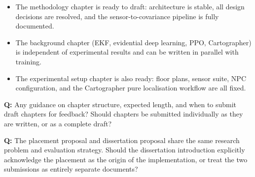 \documentclass[11pt,a4paper]{article}
\newcommand{\question}[1]{\textcolor{question}{\textbf{Q:}} #1}
\begin{document}
\begin{itemize}[leftmargin=*]
  \item The methodology chapter is ready to draft: architecture is stable,
    all design decisions are resolved, and the sensor-to-covariance pipeline
    is fully documented.
  \item The background chapter (EKF, evidential deep learning, PPO,
    Cartographer) is independent of experimental results and can be written
    in parallel with training.
  \item The experimental setup chapter is also ready: floor plans, sensor
    suite, NPC configuration, and the Cartographer pure localisation workflow
    are all fixed.
\end{itemize}

\question{Any guidance on chapter structure, expected length, and when to
submit draft chapters for feedback? Should chapters be submitted individually
as they are written, or as a complete draft?}

\question{The placement proposal and dissertation proposal share the same
research problem and evaluation strategy. Should the dissertation introduction
explicitly acknowledge the placement as the origin of the implementation, or
treat the two submissions as entirely separate documents?}
\end{document}
